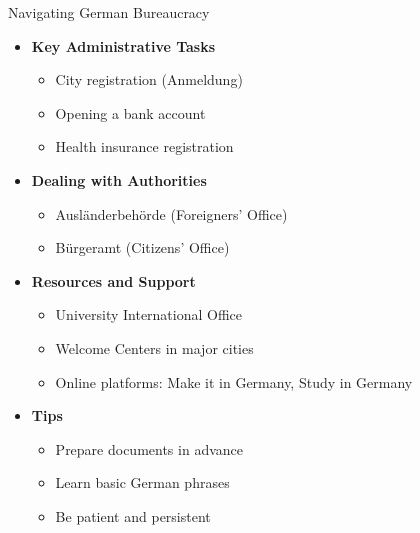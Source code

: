 \documentclass[aspectratio=169,10pt]{beamer}
\begin{document}
\begin{frame}{Navigating German Bureaucracy}
\begin{itemize}
    \item \textbf{Key Administrative Tasks}
    \begin{itemize}
        \item City registration (Anmeldung)
        \item Opening a bank account
        \item Health insurance registration
    \end{itemize}
    \item \textbf{Dealing with Authorities}
    \begin{itemize}
        \item Ausländerbehörde (Foreigners' Office)
        \item Bürgeramt (Citizens' Office)
    \end{itemize}
    \item \textbf{Resources and Support}
    \begin{itemize}
        \item University International Office
        \item Welcome Centers in major cities
        \item Online platforms: Make it in Germany, Study in Germany
    \end{itemize}
    \item \textbf{Tips}
    \begin{itemize}
        \item Prepare documents in advance
        \item Learn basic German phrases
        \item Be patient and persistent
    \end{itemize}
\end{itemize}
\end{frame}
\end{document}
